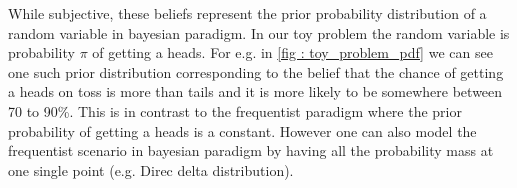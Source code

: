 While subjective, these beliefs represent the prior probability distribution of a random variable in bayesian paradigm. In our toy 
problem the random variable is probability $\pi$ of getting a heads. For e.g. in \ref{fig : toy_problem_pdf} we can see one such prior distribution corresponding to the belief that the chance of getting a heads on toss is more than tails and it is more likely to be somewhere between 70 to 90\%. This is in contrast to the frequentist paradigm where the prior probability of getting a heads is a constant. However one can also model the frequentist scenario in bayesian paradigm by having all the probability mass at one single point (e.g. Direc delta distribution). 

